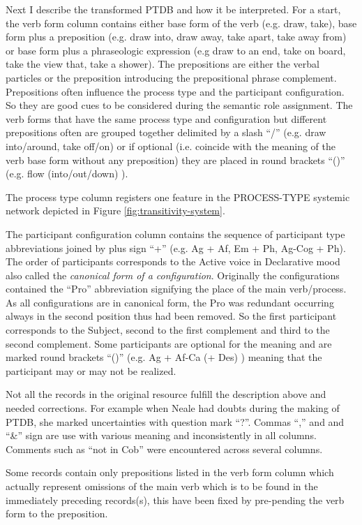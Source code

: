 Next I describe the transformed PTDB and how it be interpreted. For a start, the verb form column contains either base form of the verb (e.g. draw, take), base form plus a preposition (e.g. draw into, draw away, take apart, take away from) or base form plus a phraseologic expression (e.g draw to an end, take on board, take the view that, take a shower). The prepositions are either the verbal particles or the preposition introducing the prepositional phrase complement. Prepositions often influence the process type and the participant configuration. So they are good cues to be considered during the semantic role assignment. The verb forms that have the same process type and configuration but different prepositions often are grouped together delimited by a slash ``/'' (e.g. draw into/around, take off/on) or if optional (i.e. coincide with the meaning of the verb base form without any preposition) they are placed in round brackets ``()'' (e.g. flow (into/out/down) ).

The process type column registers one feature in the PROCESS-TYPE systemic network depicted in Figure \ref{fig:transitivity-system}. 

The participant configuration column contains the sequence of participant type abbreviations joined by plus sign ``+'' (e.g. Ag + Af, Em + Ph, Ag-Cog + Ph). The order of participants corresponds to the Active voice in Declarative mood also called the \textit{canonical form of a configuration}. Originally the configurations contained the ``Pro'' abbreviation signifying the place of the main verb/process. As all configurations are in canonical form, the Pro was redundant occurring always in the second position thus had been removed. So the first participant corresponds to the Subject, second to the first complement and third to the second complement. Some participants are optional for the meaning and are marked round brackets ``()'' (e.g. Ag + Af-Ca (+ Des) ) meaning that the participant may or may not be realized.

Not all the records in the original resource fulfill the description above and needed corrections. For example when Neale had doubts during the making of PTDB, she marked uncertainties with question mark ``?''. Commas ``,'' and and ``\&'' sign are use with various meaning and inconsistently in all columns. Comments such as ``not in Cob'' were encountered across several columns. 

Some records contain only prepositions listed in the verb form column which actually represent omissions of the main verb which is to be found in the immediately preceding records(s), this have been fixed by pre-pending the verb form to the preposition. 


